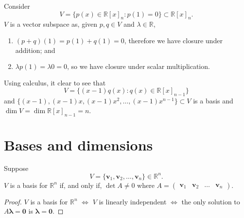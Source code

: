 \begin{example}
    Consider \[V = \{p(x) \in \mathbb{R}[x]_n : p(1) = 0\} \subset \mathbb{R}[x]_n.\] $V$ is a vector subspace as, given $p, q \in V$ and $\lambda \in \mathbb{R}$,
    \begin{enumerate}
        \item $(p + q)(1) = p(1) + q(1) = 0$, therefore we have closure under addition; and
        \item $\lambda p(1) = \lambda 0 = 0$, so we have closure under scalar multiplication.
    \end{enumerate}
    Using calculus, it clear to see that \[V = \{(x - 1) q(x) : q(x) \in \mathbb{R}[x]_{n - 1}\}\] and $\{(x - 1), (x - 1) x, (x - 1) x^2, \ldots, (x - 1) x^{n - 1}\} \subset V$ is a basis and $\dim{V}=\dim{\mathbb{R}[x]_{n-1}}=n$.
\end{example}

\section{Bases and dimensions}

\begin{proposition}
    Suppose \[V = \{\bm{v}_1, \bm{v}_2, \ldots, \bm{v}_n\} \in \mathbb{R}^n.\] $V$ is a basis for $\mathbb{R}^n$ if, and only if, $\det{A} \neq 0$ where
    $
        A =
        \begin{pmatrix}
            \bm{v}_1 & \bm{v}_2 & \ldots & \bm{v}_n
        \end{pmatrix}
    $.
\end{proposition}

\begin{proof}
    $V$ is a basis for $\mathbb{R}^n$ $\iff$ $V$ is linearly independent $\iff$ the only solution to $A \bm{\lambda} = \bm{0}$ is $\bm{\lambda} = \bm{0}$.
\end{proof}

